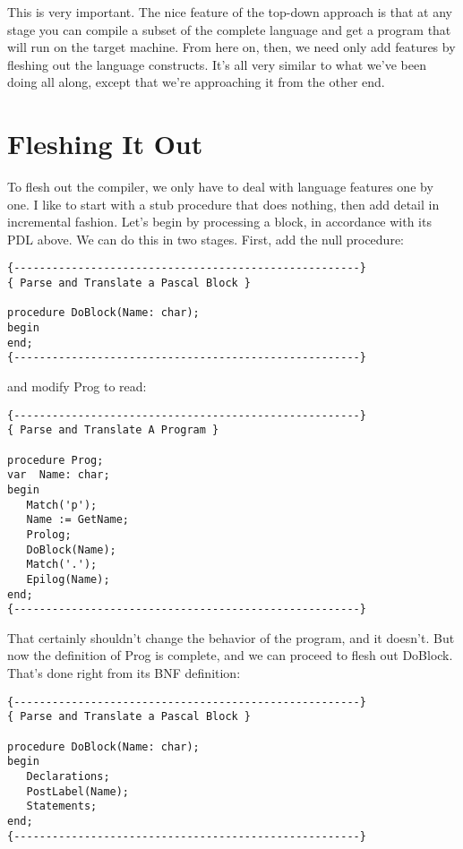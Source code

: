 This  is  very  important. The  nice  feature  of  the  top-down approach is that at any stage you can  compile  a  subset  of the complete language and get  a  program that will run on the target machine. From here on, then, we  need  only  add  features  by fleshing out the language constructs. It's all  very  similar to what we've been doing all along, except that we're approaching it from the other end.

\section{Fleshing It Out}

To flesh out  the  compiler, we  only have to deal with language features  one by one. I like to start with a stub procedure that does  nothing, then add detail in  incremental  fashion. Let's begin  by  processing  a block, in accordance with its PDL above. We can do this in two stages. First, add the null procedure:

\begin{verbatim}
{------------------------------------------------------}
{ Parse and Translate a Pascal Block }

procedure DoBlock(Name: char);
begin
end;
{------------------------------------------------------}
\end{verbatim}

and modify Prog to read:

\begin{verbatim}
{------------------------------------------------------}
{ Parse and Translate A Program }

procedure Prog;
var  Name: char;
begin
   Match('p');
   Name := GetName;
   Prolog;
   DoBlock(Name);
   Match('.');
   Epilog(Name);
end;
{------------------------------------------------------}
\end{verbatim}

That certainly  shouldn't change the behavior of the program, and it doesn't. But now the  definition  of Prog is complete, and we can proceed to flesh out DoBlock. That's done right from its BNF definition:

\begin{verbatim}
{------------------------------------------------------}
{ Parse and Translate a Pascal Block }

procedure DoBlock(Name: char);
begin
   Declarations;
   PostLabel(Name);
   Statements;
end;
{------------------------------------------------------}
\end{verbatim}


